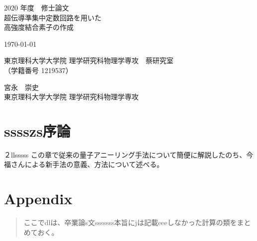 \documentclass[uplatex,openany,oneside,a4j,11pt]{jsbook}
\begin{document}
\begin{titlepage}
    \begin{center}
        {\Large 2020 年度　修士論文}\\
        \vspace{180truept}
        {\Huge 超伝導準集中定数回路を用いた\\
        \vspace{10truept}
        高強度結合素子の作成}\\ 
        \vspace{70truept}

        {\Large \today}\\

        \vspace{70truept}

        {\Large 東京理科大学大学院 理学研究科物理学専攻　蔡研究室\\
        （学籍番号 1219537）}\\

        \vspace{20truept}

        {\huge 宮永　崇史}\\

        \vspace{160truept}
        {\Large 東京理科大学大学院 理学研究科物理学専攻}\\
    \end{center}
\end{titlepage}
% 

\chapter{sssszs序論}
        ２llsssss
        この章で従来の\cite{nakamura1999coherent}量子アニーリング手法について簡便に解説したのち、今福さんによる新手法の意義、方法について述べる。\\
    

\chapter{Appendix}
\begin{abstract}
    ここでdlは、卒業論s文sssssss本旨にjは記載eeeしなかった計算の類をまとめておく。

\end{abstract}
\begin{appendix}
    
\end{appendix}
%
\printbibliography[title=参考文献]
\end{document}
